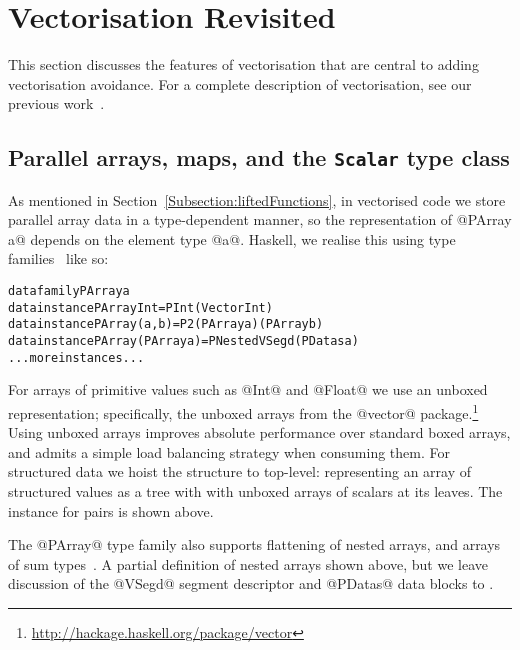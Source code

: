 \section{Vectorisation Revisited}
\label{Section:Vectorisation}

This section discusses the features of vectorisation that are central to adding vectorisation avoidance. For a complete description of vectorisation, see our previous work~\cite{Jones08harnessingthe}.


\subsection{Parallel arrays, maps, and the \texttt{Scalar} type class}
\label{sec:flattening-arrays}
\label{Subsection:Scalar}

As mentioned in Section~\ref{Subsection:liftedFunctions}, in vectorised code we store parallel array data in a type-dependent manner, so the representation of @PArray a@ depends on the element type @a@. Haskell, we realise this using type families~\cite{chak-etal:ATs,chak-etal:at-syns} like so:
%
\begin{small}
\begin{alltt}
data family   PArray a
data instance PArray Int        = PInt (Vector Int)
data instance PArray (a, b)     = P2 (PArray a) (PArray b)
data instance PArray (PArray a) = PNested VSegd (PDatas a)
... more instances ...
\end{alltt}
\end{small}

For arrays of primitive values such as @Int@ and @Float@ we use an unboxed representation; specifically, the unboxed arrays from the @vector@ package.\footnote{\url{http://hackage.haskell.org/package/vector}} Using unboxed arrays improves absolute performance over standard boxed arrays, and admits a simple load balancing strategy when consuming them. For structured data we hoist the structure to top-level: representing an array of structured values as a tree with with unboxed arrays of scalars at its leaves. The instance for pairs is shown above. 

The @PArray@ type family also supports flattening of nested arrays, and arrays of sum types~\cite{chak-etal:status-report, Jones08harnessingthe, lippmeier:work-efficient}. A partial definition of nested arrays shown above, but we leave discussion of the @VSegd@ segment descriptor and @PDatas@ data blocks to \cite{lippmeier:work-efficient}. 

